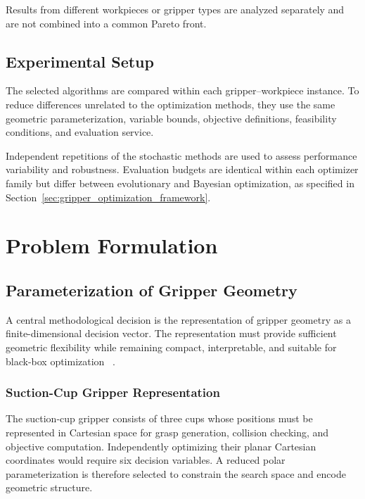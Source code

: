 Results from different workpieces or gripper types are analyzed
separately and are not combined into a common Pareto front.

\subsection{Experimental Setup}
\label{subsec:experimental_setup}
\label{sec:methodology_comparative_experiments}

The selected algorithms are compared within each gripper--workpiece
instance. To reduce differences unrelated to the optimization methods,
they use the same geometric parameterization, variable bounds, objective
definitions, feasibility conditions, and evaluation service.

Independent repetitions of the stochastic methods are used to assess
performance variability and robustness. Evaluation budgets are identical
within each optimizer family but differ between evolutionary and
Bayesian optimization, as specified in
Section~\ref{sec:gripper_optimization_framework}.

\section{Problem Formulation}
\label{sec:methodology_problem_formulation}


\subsection{Parameterization of Gripper Geometry}
\label{subsec:methodology_decision_variables}

A central methodological decision is the representation of gripper geometry as a finite-dimensional decision vector. The representation must provide
sufficient geometric flexibility while remaining compact, interpretable, and suitable for black-box optimization
~\cite{Ko2020A,Todescato,Wang2024Fin-Bayes:}.

\subsubsection{Suction-Cup Gripper Representation}
\label{subsubsec:suction_cup_representation}

The suction-cup gripper consists of three cups whose positions must be
represented in Cartesian space for grasp generation, collision checking,
and objective computation. Independently optimizing their planar
Cartesian coordinates would require six decision variables. A reduced
polar parameterization is therefore selected to constrain the search
space and encode geometric structure.

